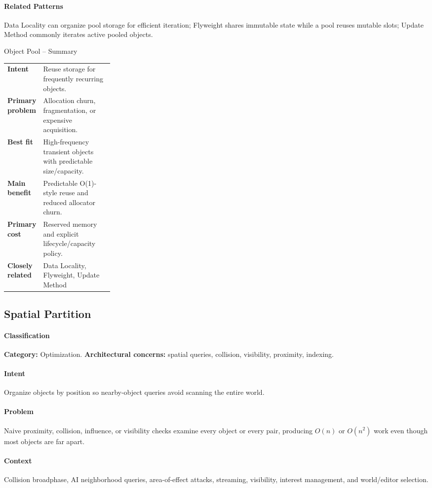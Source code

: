 \documentclass[11pt]{article}
\begin{document}
\paragraph{Related Patterns} Data Locality can organize pool storage for efficient iteration; Flyweight shares immutable state while a pool reuses mutable slots; Update Method commonly iterates active pooled objects.

\begin{patternsummary}{Object Pool -- Summary}
\begin{tabularx}{\linewidth}{@{}>{\bfseries}p{0.25\linewidth}X@{}}
Intent & Reuse storage for frequently recurring objects. \\
Primary problem & Allocation churn, fragmentation, or expensive acquisition. \\
Best fit & High-frequency transient objects with predictable size/capacity. \\
Main benefit & Predictable O(1)-style reuse and reduced allocator churn. \\
Primary cost & Reserved memory and explicit lifecycle/capacity policy. \\
Closely related & Data Locality, Flyweight, Update Method \\
\end{tabularx}
\end{patternsummary}

\subsection{Spatial Partition}\label{pat:spatial-partition}
\paragraph{Classification} \textbf{Category:} Optimization. \textbf{Architectural concerns:} spatial queries, collision, visibility, proximity, indexing.
\paragraph{Intent} Organize objects by position so nearby-object queries avoid scanning the entire world.
\paragraph{Problem} Naive proximity, collision, influence, or visibility checks examine every object or every pair, producing $O(n)$ or $O(n^2)$ work even though most objects are far apart.
\paragraph{Context} Collision broadphase, AI neighborhood queries, area-of-effect attacks, streaming, visibility, interest management, and world/editor selection.
\end{document}
